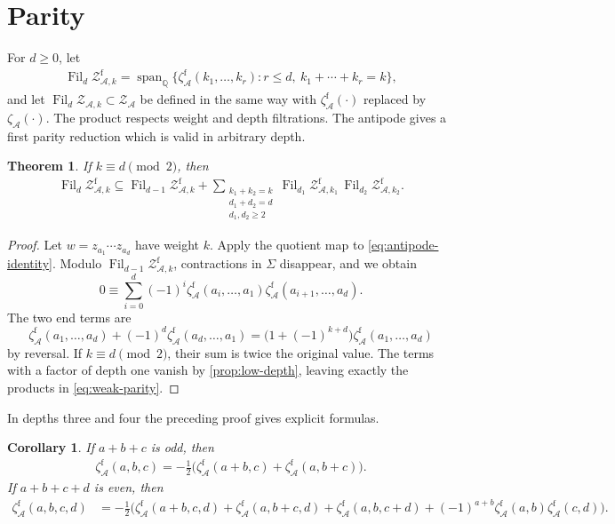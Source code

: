 \documentclass[12pt]{amsart}
\numberwithin{equation}{section}
\theoremstyle{plain}
\newtheorem{thm}{Theorem}[section]
\newtheorem{cor}[cor]{Corollary}
\newcommand{\QQ}{\mathbb{Q}}
\DeclareMathOperator{\Span}{span}
\DeclareMathOperator{\Fil}{Fil}
\newcommand{\ZA}{{\mathcal Z_{\mathcal A}}}
\newcommand{\ZAw}[1]{{\mathcal Z_{\mathcal A,#1}}}
\newcommand{\ZAfw}[1]{{\mathcal Z_{\mathcal A,#1}^{\mathrm f}}}
\newcommand{\za}[1]{\zeta_{\mathcal A}(#1)}
\newcommand{\zaf}[1]{\zeta_{\mathcal A}^{\mathrm f}(#1)}
\begin{document}
\section{Parity}\label{sec:parity}

For $d\geq0$, let
\begin{align}\label{eq:depth-filtration}
 \Fil_d\ZAfw{k}
 =\Span_{\QQ}\{\zaf{k_1,\ldots,k_r}:r\leq d,\ k_1+\cdots+k_r=k\},
\end{align}
and let $\Fil_d\ZAw{k}\subset\ZA$ be defined in the same way with
$\zaf{\cdot}$ replaced by $\za{\cdot}$.
The product respects weight and depth filtrations. The antipode gives a first parity reduction which is valid in arbitrary depth.

\begin{thm}\label{thm:weak-parity}
If $k\equiv d\pmod2$, then
\begin{align}\label{eq:weak-parity}
 \Fil_d\ZAfw{k}\subseteq\Fil_{d-1}\ZAfw{k}
 +\sum_{\substack{k_1+k_2=k\\d_1+d_2=d\\d_1,d_2\geq2}}
 \Fil_{d_1}\ZAfw{k_1}\,\Fil_{d_2}\ZAfw{k_2}.
\end{align}
\end{thm}

\begin{proof}
Let $w=z_{a_1}\cdots z_{a_d}$ have weight $k$. Apply the quotient map to \eqref{eq:antipode-identity}. Modulo $\Fil_{d-1}\ZAfw{k}$, contractions in $\Sigma$ disappear, and we obtain
\[
 0\equiv\sum_{i=0}^d(-1)^i
 \zaf{a_i,\ldots,a_1}\zaf{a_{i+1},\ldots,a_d}.
\]
The two end terms are
\[
 \zaf{a_1,\ldots,a_d}+(-1)^d\zaf{a_d,\ldots,a_1}
 =\bigl(1+(-1)^{k+d}\bigr)\zaf{a_1,\ldots,a_d}
\]
by reversal. If $k\equiv d\pmod2$, their sum is twice the original value. The terms with a factor of depth one vanish by \cref{prop:low-depth}, leaving exactly the products in \eqref{eq:weak-parity}.
\end{proof}

In depths three and four the preceding proof gives explicit formulas.

\begin{cor}\label{cor:weak-low-depth}
If $a+b+c$ is odd, then
\begin{align}\label{eq:weak-depth-three}
 \zaf{a,b,c}
 =-\frac12\bigl(\zaf{a+b,c}+\zaf{a,b+c}\bigr).
\end{align}
If $a+b+c+d$ is even, then
\begin{align}
 \zaf{a,b,c,d}
 &=-\frac12\bigl(\zaf{a+b,c,d}+\zaf{a,b+c,d}
 +\zaf{a,b,c+d}+(-1)^{a+b}\zaf{a,b}\zaf{c,d}\bigr).
 \label{eq:weak-depth-four}
\end{align}
\end{cor}
\end{document}
